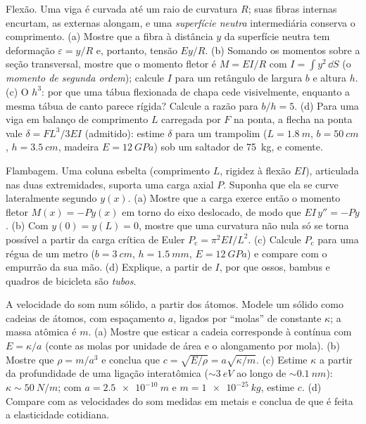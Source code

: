 \begin{exercise}[$\star\star\star$]\label{exo:b3:continuum-elasticity:10}
Flexão. Uma viga é curvada até um raio de curvatura $R$; suas fibras
internas encurtam, as externas alongam, e uma \emph{superfície neutra}
intermediária conserva o comprimento. (a) Mostre que a fibra à
distância $y$ da superfície neutra tem deformação $\varepsilon = y/R$
e, portanto, tensão $Ey/R$. (b) Somando os momentos sobre a seção
transversal, mostre que o momento fletor é $M = EI/R$ com
$I = \int y^2\,\dd S$ (o \emph{momento de segunda ordem}); calcule $I$
para um retângulo de largura $b$ e altura $h$. (c) O $h^3$: por que uma
tábua flexionada de chapa cede visivelmente, enquanto a mesma tábua de
canto parece rígida? Calcule a razão para $b/h = 5$. (d) Para uma viga
em balanço de comprimento $L$ carregada por $F$ na ponta, a flecha na
ponta vale $\delta = FL^3/3EI$ (admitido): estime $\delta$ para um
trampolim ($L = \qty{1.8}{m}$, $b = \qty{50}{cm}$, $h = \qty{3.5}{cm}$,
madeira $E
= \qty{12}{GPa}$) sob um saltador de \qty{75}{kg}, e comente.
\end{exercise}

\begin{exercise}[$\star\star\star$]\label{exo:b3:continuum-elasticity:11}
Flambagem. Uma coluna esbelta (comprimento $L$, rigidez à flexão
$EI$), articulada nas duas extremidades, suporta uma carga axial $P$.
Suponha que ela se curve lateralmente segundo $y(x)$. (a) Mostre que a
carga exerce então o momento fletor $M(x) = -Py(x)$ em torno do eixo
deslocado, de modo que $EI\,y'' = -Py$. (b) Com
$y(0) = y(L) = 0$, mostre que uma curvatura não nula só se torna
possível a partir da carga crítica de Euler
$P_{\text{c}} = \pi^2EI/L^2$. (c) Calcule $P_{\text{c}}$ para uma
régua de um metro ($b = \qty{3}{cm}$, $h = \qty{1.5}{mm}$, $E = \qty{12}{GPa}$)
e compare com o empurrão da sua mão. (d) Explique, a partir de $I$,
por que ossos, bambus e quadros de bicicleta são \emph{tubos}.
\end{exercise}

\begin{exercise}[$\star\star\star$]\label{exo:b3:continuum-elasticity:12}
A velocidade do som num sólido, a partir dos átomos. Modele um sólido
como cadeias de átomos, com espaçamento $a$, ligados por ``molas'' de
constante $\kappa$; a massa atômica é $m$. (a) Mostre que esticar a
cadeia corresponde à  contínua com $E = \kappa/a$ (conte as molas
por unidade de área e o alongamento por mola). (b) Mostre que
$\rho = m/a^3$ e conclua que $c =
\sqrt{E/\rho} = a\sqrt{\kappa/m}$. (c) Estime $\kappa$ a partir da
profundidade de uma ligação interatômica ($\sim\qty{3}{eV}$ ao longo de $\sim
\qty{0.1}{nm}$): $\kappa \sim \qty{50}{N/m}$; com $a =
\qty{2.5e-10}{m}$ e $m = \qty{1e-25}{kg}$, estime $c$. (d) Compare com
as velocidades do som medidas em metais e conclua de que é feita a
elasticidade cotidiana.
\end{exercise}

